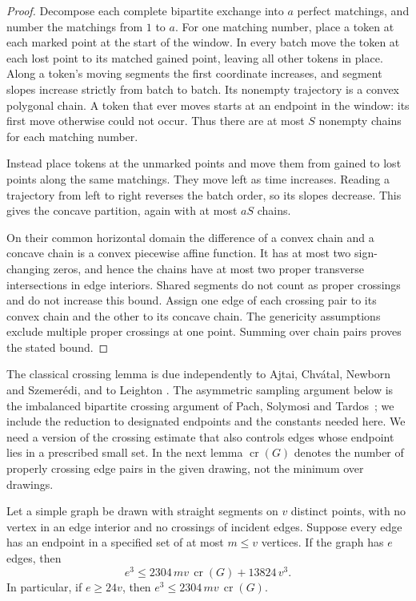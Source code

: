 \begin{proof}
Decompose each complete bipartite exchange into $a$ perfect matchings,
and number the matchings from $1$ to $a$.  For one matching number,
place a token at each marked point at the start of the window.
In every batch move the token at each lost point to its matched gained
point, leaving all other tokens in place.  Along a token's moving
segments the first coordinate increases, and segment slopes increase
strictly from batch to batch.  Its nonempty trajectory is a convex
polygonal chain.  A token that ever moves starts at an endpoint in
the window: its first move otherwise could not occur.  Thus there
are at most $S$ nonempty chains for each matching number.

Instead place tokens at the unmarked points and move them from gained
to lost points along the same matchings.  They move left as time
increases.  Reading a trajectory from left to right reverses the
batch order, so its slopes decrease.  This gives the concave
partition, again with at most $aS$ chains.

On their common horizontal domain the difference of a convex chain
and a concave chain is a convex piecewise affine function.  It has
at most two sign-changing zeros, and hence the chains have at most
two proper transverse intersections in edge interiors.  Shared
segments do not count as proper crossings and do not increase this
bound.  Assign one edge of each crossing pair to its convex chain
and the other to its concave chain.  The genericity assumptions
exclude multiple proper crossings at one point.  Summing over chain
pairs proves the stated bound.
\end{proof}

The classical crossing lemma is due independently to Ajtai, Chv{\'a}tal,
Newborn and Szemer{\'e}di, and to Leighton
\cite{AjtaiEtAl1982,Leighton1983}. The asymmetric sampling argument
below is the imbalanced bipartite crossing argument of Pach, Solymosi
and Tardos~\cite[Lemmas~2.1--2.2]{PachSolymosiTardos2010}; we include
the reduction to designated endpoints and the constants needed here.
We need a version of the crossing estimate that also controls edges
whose endpoint lies in a prescribed small set.  In the next lemma
$\operatorname{cr}(G)$ denotes the number of properly crossing edge
pairs in the given drawing, not the minimum over drawings.

\begin{lemma}
\label{lem:designated-crossing}
Let a simple graph be drawn with straight segments on $v$ distinct
points, with no vertex in an edge interior and no crossings of
incident edges.  Suppose every edge has an endpoint in a specified
set of at most $m\le v$ vertices.  If the graph has $e$ edges, then
\[
 e^3\le 2304\,mv\,\operatorname{cr}(G)+13824\,v^3.
\]
In particular, if $e\ge24v$, then
$e^3\le2304\,mv\,\operatorname{cr}(G)$.
\end{lemma}

